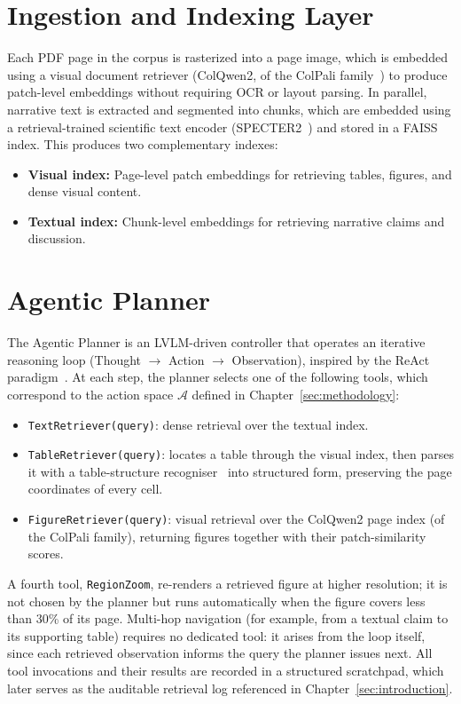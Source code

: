\section{Ingestion and Indexing Layer}
Each PDF page in the corpus is rasterized into a page image, which is embedded using a visual document retriever (ColQwen2, of the ColPali family~\cite{faysse2025colpali}) to produce patch-level embeddings without requiring OCR or layout parsing. In parallel, narrative text is extracted and segmented into chunks, which are embedded using a retrieval-trained scientific text encoder (SPECTER2~\cite{singh2023scirepeval}) and stored in a FAISS~\cite{johnson2019faiss} index. This produces two complementary indexes:
\begin{itemize}
    \item \textbf{Visual index:} Page-level patch embeddings for retrieving tables, figures, and dense visual content.
    \item \textbf{Textual index:} Chunk-level embeddings for retrieving narrative claims and discussion.
\end{itemize}

\section{Agentic Planner}
The Agentic Planner is an LVLM-driven controller that operates an iterative reasoning loop (Thought $\rightarrow$ Action $\rightarrow$ Observation), inspired by the ReAct paradigm~\cite{yao2023react}. At each step, the planner selects one of the following tools, which correspond to the action space $\mathcal{A}$ defined in Chapter~\ref{sec:methodology}:
\begin{itemize}
    \item \texttt{TextRetriever(query)}: dense retrieval over the textual index.
    \item \texttt{TableRetriever(query)}: locates a table through the visual index, then parses it with a table-structure recogniser~\cite{smock2022pubtables} into structured form, preserving the page coordinates of every cell.
    \item \texttt{FigureRetriever(query)}: visual retrieval over the ColQwen2 page index (of the ColPali family), returning figures together with their patch-similarity scores.
\end{itemize}
A fourth tool, \texttt{RegionZoom}, re-renders a retrieved figure at higher resolution; it is not chosen by the planner but runs automatically when the figure covers less than 30\% of its page.
Multi-hop navigation (for example, from a textual claim to its supporting table) requires no dedicated tool: it arises from the loop itself, since each retrieved observation informs the query the planner issues next. All tool invocations and their results are recorded in a structured scratchpad, which later serves as the auditable retrieval log referenced in Chapter~\ref{sec:introduction}.

